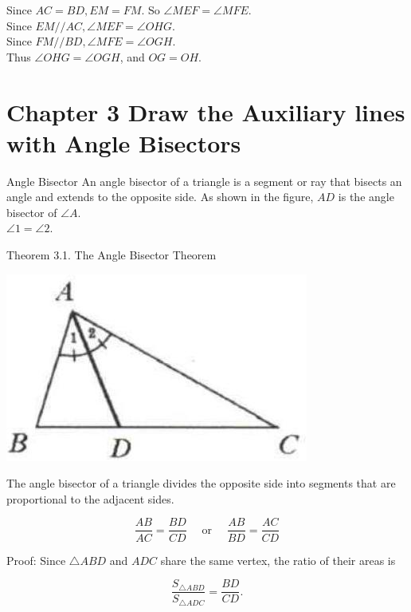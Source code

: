 \documentclass{article}
\begin{document}
Since \(A C=B D, E M=F M\). So \(\angle M E F=\angle M F E\).\\
Since \(E M / / A C, \angle M E F=\angle O H G\).\\
Since \(F M / / B D, \angle M F E=\angle O G H\).\\
Thus \(\angle O H G=\angle O G H\), and \(O G=O H\).

\section*{Chapter 3 Draw the Auxiliary lines with Angle Bisectors}
Angle Bisector
An angle bisector of a triangle is a segment or ray that bisects an angle and extends to the opposite side. As shown in the figure, \(A D\) is the angle bisector of \(\angle A\).\\
\(\angle 1=\angle 2\).

Theorem 3.1. The Angle Bisector Theorem
\begin{center}
\includegraphics[width=\textwidth]{images/053.jpg}
\end{center}

The angle bisector of a triangle divides the opposite side into segments that are proportional to the adjacent sides.

\[
\frac{A B}{A C}=\frac{B D}{C D} \quad \text { or } \quad \frac{A B}{B D}=\frac{A C}{C D}
\]

Proof:
Since \(\triangle A B D\) and \(A D C\) share the same vertex, the ratio of their areas is

\[
\frac{S_{\triangle A B D}}{S_{\triangle A D C}}=\frac{B D}{C D} .
\]
\end{document}
